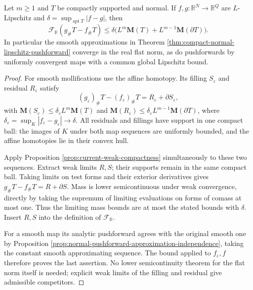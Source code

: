 \begin{proposition}\label{prop:normal-lipschitz-map-flat-stability}
Let $m\geq1$ and $T$ be compactly supported and normal. If $f,g:\mathbb R^N\to\mathbb R^Q$ are $L$-Lipschitz and $\delta=\sup_{\operatorname{spt}T}|f-g|$, then
\[
 \mathcal F_{\mathbb R}(g_\#T-f_\#T)
 \leq\delta\bigl(L^m\mathbf M(T)+L^{m-1}\mathbf M(\partial T)\bigr).
\]
In particular the smooth approximations in Theorem \ref{thm:compact-normal-lipschitz-pushforward} converge in the real flat norm, as do pushforwards by uniformly convergent maps with a common global Lipschitz bound.
\end{proposition}
\begin{proof}
For smooth mollifications use the affine homotopy. Its filling $S_\varepsilon$ and residual $R_\varepsilon$ satisfy
\[
 (g_\varepsilon)_\#T-(f_\varepsilon)_\#T
 =R_\varepsilon+\partial S_\varepsilon,
\]
with $\mathbf M(S_\varepsilon)\leq\delta_\varepsilon L^m\mathbf M(T)$ and $\mathbf M(R_\varepsilon)\leq\delta_\varepsilon L^{m-1}\mathbf M(\partial T)$, where $\delta_\varepsilon=\sup_K|f_\varepsilon-g_\varepsilon|\to\delta$. All residuals and fillings have support in one compact ball: the images of $K$ under both map sequences are uniformly bounded, and the affine homotopies lie in their convex hull.

Apply Proposition \ref{prop:current-weak-compactness} simultaneously to these two sequences. Extract weak limits $R,S$; their supports remain in the same compact ball. Taking limits on test forms and their exterior derivatives gives $g_\#T-f_\#T=R+\partial S$. Mass is lower semicontinuous under weak convergence, directly by taking the supremum of limiting evaluations on forms of comass at most one. Thus the limiting mass bounds are at most the stated bounds with $\delta$. Insert $R,S$ into the definition of $\mathcal F_{\mathbb R}$.

For a smooth map its analytic pushforward agrees with the original smooth one by Proposition \ref{prop:normal-pushforward-approximation-independence}, taking the constant smooth approximating sequence. The bound applied to $f_\varepsilon,f$ therefore proves the last assertion. No lower semicontinuity theorem for the flat norm itself is needed; explicit weak limits of the filling and residual give admissible competitors.
\end{proof}


